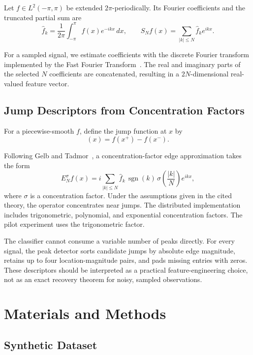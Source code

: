 \documentclass[mathematics,article,submit,moreauthors,pdftex]{mdpi}
\DeclareMathOperator{\sgn}{sgn}
\begin{document}
Let $f \in L^2(-\pi,\pi)$ be extended $2\pi$-periodically. Its Fourier coefficients and the truncated partial sum are
\begin{equation}
\widehat{f}_k = \frac{1}{2\pi}\int_{-\pi}^{\pi} f(x)e^{-ikx}\,dx, \qquad
S_N f(x) = \sum_{|k|\leq N}\widehat{f}_k e^{ikx}.
\end{equation}

For a sampled signal, we estimate coefficients with the discrete Fourier transform implemented by the Fast Fourier Transform~\cite{oppenheim2010dsp}. The real and imaginary parts of the selected $N$ coefficients are concatenated, resulting in a $2N$-dimensional real-valued feature vector.

\subsection{Jump Descriptors from Concentration Factors}

For a piecewise-smooth $f$, define the jump function at $x$ by
\begin{equation}
[f](x) = f(x^+) - f(x^-).
\end{equation}

Following Gelb and Tadmor~\cite{gelb1999edges,gelb2000nonlinear}, a concentration-factor edge approximation takes the form
\begin{equation}
E_N^{\sigma}f(x) = i\sum_{|k|\leq N}\widehat{f}_k\,\sgn(k)\,\sigma\!\left(\frac{|k|}{N}\right)e^{ikx},
\label{eq:concentration}
\end{equation}
where $\sigma$ is a concentration factor. Under the assumptions given in the cited theory, the operator concentrates near jumps. The distributed implementation includes trigonometric, polynomial, and exponential concentration factors. The pilot experiment uses the trigonometric factor.

The classifier cannot consume a variable number of peaks directly. For every signal, the peak detector sorts candidate jumps by absolute edge magnitude, retains up to four location-magnitude pairs, and pads missing entries with zeros. These descriptors should be interpreted as a practical feature-engineering choice, not as an exact recovery theorem for noisy, sampled observations.

\section{Materials and Methods}

\subsection{Synthetic Dataset}
\end{document}
